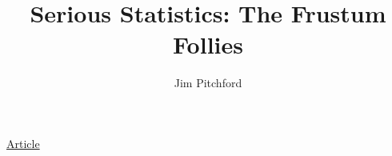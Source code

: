 \documentclass[11pt, letterpaper]{article}
\title{Serious Statistics: The Frustum Follies}
\author{Jim Pitchford}
\begin{document}
\graphicspath{{Media/}}


% 



\cleardoublepage


\cleardoublepage
\graphicspath{{Media/3DMark/}}


\cleardoublepage
\graphicspath{{Media/Shadow of the Tomb Raider/}}


\cleardoublepage
\graphicspath{{Media/Serious Sam/}}


\cleardoublepage



\vspace{\fill}
	\begin{center}
	\vfill
		{}
		
		\vspace{0.25cm}
		\href{https://github.com/GuestJim/Serious-Statistics-The-Frustum-Follies/releases}{Article}
	\end{center}
\end{document}
